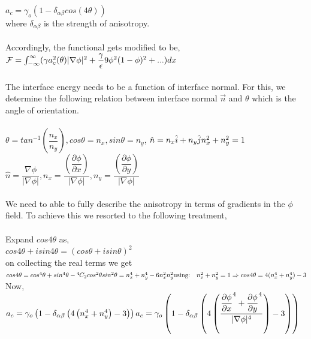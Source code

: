 \documentclass[a4paper]{report}
\newcommand*{\permcomb}[4][0mu]{{{}^{#3}\mkern#1#2_{#4}}}
\newcommand*{\comb}[1][-1mu]{\permcomb[#1]{C}}
\begin{document}
$a_c = \gamma_o\left(1 - \delta_{\alpha\beta}cos(4\theta)\right)$\\
where $\delta_{\alpha\beta}$ is the strength of anisotropy.\\
\\
Accordingly, the functional gets modified to be,\\
${\cal F} = \int_{-\infty}^{\infty}(\gamma a_c^2(\theta)|\nabla\phi|^2 + \dfrac{\gamma}{\epsilon}9\phi^2(1-\phi)^2 + ...)dx$\\
\\
The interface energy needs to be a function of interface normal. For this, we determine the 
following relation between interface normal $\vec{n}$ and $\theta$ which is the angle of orientation.\\
\\
$\theta = tan^{-1}\left(\dfrac{n_x}{n_y}\right), cos\theta = n_x, sin\theta = n_y$, 
$\hat{n} = n_x\hat{i} + n_y\hat{j}\\ n_x^2 + n_y^2 = 1$\\
$\hat{n} = \dfrac{\nabla\phi}{|\nabla\phi|}, 
n_x = \dfrac{\left(\dfrac{\partial\phi}{\partial x}\right)}{|\nabla\phi|},
n_y = \dfrac{\left(\dfrac{\partial\phi}{\partial y}\right)}{|\nabla\phi|}$\\
\\
We need to able to fully describe the anisotropy in terms of gradients in the 
$\phi$ field. To achieve this we resorted to the following treatment,\\
\\
Expand $cos 4\theta$ as,\\
$cos 4\theta + i sin 4\theta = (cos\theta + i sin\theta)^2$ \\
on collecting the real terms we get\\
$cos 4\theta = cos^4 \theta + sin^4 \theta - \comb{4}{2} cos^2 \theta sin^2 \theta\\ 
= n_x^4 + n_y^4 - 6 n_x^2 n_y^2\\
\\
\text{using:} \quad n_x^2 + n_y^2 = 1\\
\Rightarrow cos 4\theta = 4(n_x^4 + n_y^4) - 3
$\\
Now, $a_c = \gamma_o\left(1 - \delta_{\alpha\beta}\left(4\left(n_x^4 + n_y^4\right) - 3\right)\right)\\
\\
a_c = \gamma_o\left(1 - \delta_{\alpha\beta}\left(4\left(\dfrac{\dfrac{\partial\phi}{\partial x}^4 + \dfrac{\partial\phi}{\partial y}^4}{|\nabla\phi|^4}\right)
 - 3\right)\right)$\\
\end{document}
